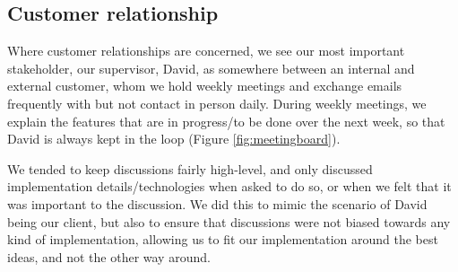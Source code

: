 \documentclass[a4paper]{article}
\begin{document}
\subsection{Customer relationship}

Where customer relationships are concerned, we see our most important stakeholder, our supervisor, David, as somewhere between an internal and external customer, whom we hold weekly meetings and exchange emails frequently with but not contact in person daily. During weekly meetings, we explain the features that are in progress/to be done over the next week, so that David is always kept in the loop (Figure \ref{fig:meetingboard}).

We tended to keep discussions fairly high-level, and only discussed implementation details/technologies when asked to do so, or when we felt that it was important to the discussion. We did this to mimic the scenario of David being our client, but also to ensure that discussions were not biased towards any kind of implementation, allowing us to fit our implementation around the best ideas, and not the other way around.
\end{document}
